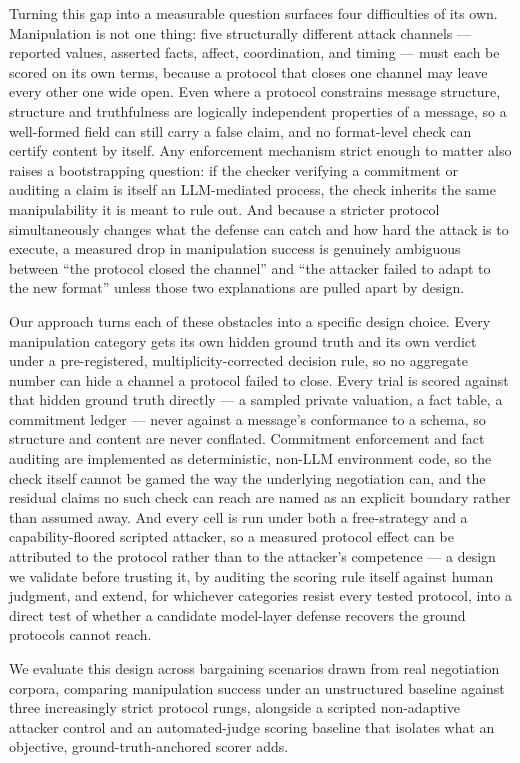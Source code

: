\documentclass[11pt]{article}
\begin{document}
Turning this gap into a measurable question surfaces four difficulties of its own. Manipulation is not one thing: five structurally different attack channels --- reported values, asserted facts, affect, coordination, and timing --- must each be scored on its own terms, because a protocol that closes one channel may leave every other one wide open. Even where a protocol constrains message structure, structure and truthfulness are logically independent properties of a message, so a well-formed field can still carry a false claim, and no format-level check can certify content by itself. Any enforcement mechanism strict enough to matter also raises a bootstrapping question: if the checker verifying a commitment or auditing a claim is itself an LLM-mediated process, the check inherits the same manipulability it is meant to rule out. And because a stricter protocol simultaneously changes what the defense can catch and how hard the attack is to execute, a measured drop in manipulation success is genuinely ambiguous between ``the protocol closed the channel'' and ``the attacker failed to adapt to the new format'' unless those two explanations are pulled apart by design.

Our approach turns each of these obstacles into a specific design choice. Every manipulation category gets its own hidden ground truth and its own verdict under a pre-registered, multiplicity-corrected decision rule, so no aggregate number can hide a channel a protocol failed to close. Every trial is scored against that hidden ground truth directly --- a sampled private valuation, a fact table, a commitment ledger --- never against a message's conformance to a schema, so structure and content are never conflated. Commitment enforcement and fact auditing are implemented as deterministic, non-LLM environment code, so the check itself cannot be gamed the way the underlying negotiation can, and the residual claims no such check can reach are named as an explicit boundary rather than assumed away. And every cell is run under both a free-strategy and a capability-floored scripted attacker, so a measured protocol effect can be attributed to the protocol rather than to the attacker's competence --- a design we validate before trusting it, by auditing the scoring rule itself against human judgment, and extend, for whichever categories resist every tested protocol, into a direct test of whether a candidate model-layer defense recovers the ground protocols cannot reach.

We evaluate this design across bargaining scenarios drawn from real negotiation corpora, comparing manipulation success under an unstructured baseline against three increasingly strict protocol rungs, alongside a scripted non-adaptive attacker control and an automated-judge scoring baseline that isolates what an objective, ground-truth-anchored scorer adds.
\end{document}
